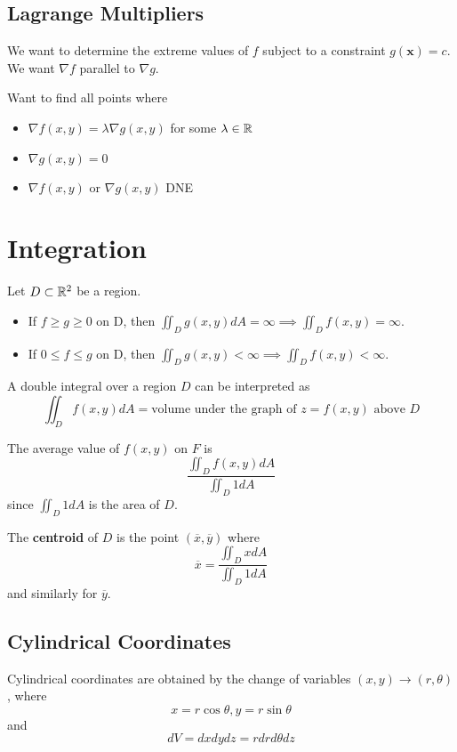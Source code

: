 \documentclass{article}
\begin{document}
\subsection{Lagrange Multipliers}
\begin{remark}
  We want to determine the extreme values of $f$ subject to a constraint $g(\textbf{x}) = c$. We want $\nabla f$ parallel to $\nabla g$.
\end{remark}
\begin{theorem}
  Want to find all points where
  \begin{itemize}
    \item $\nabla f(x, y) = \lambda \nabla g(x, y)$ for some $\lambda \in \mathbb{R}$
    \item $\nabla g(x, y) = 0$
    \item $\nabla f(x, y)$ or $\nabla g(x, y)$ DNE
  \end{itemize}
\end{theorem}
\section{Integration}
\begin{cthm}
  Let $D \subset \mathbb{R}^2$ be a region.
  \begin{itemize}
    \item If $f \geq g \geq 0$ on D, then $
      \iint_D g(x, y) dA = \infty \implies \iint_D f(x, y) = \infty$.
    \item If $0 \leq f \leq g$ on D, then $
      \iint_D g(x, y) < \infty \implies \iint_D f(x, y) < \infty$.
  \end{itemize}
\end{cthm}
\begin{proposition}
  A double integral over a region $D$ can be interpreted as \[
    \iint_D f(x, y) dA = \text{volume under the graph of } z = f(x, y) \text{ above }D
  \]
\end{proposition}
\begin{theorem}
  The average value of $f(x, y)$ on $F$ is \[
    \frac{\iint_D f(x,y) dA}{\iint_D 1 dA}
  \] since $\iint_D 1 dA$ is the area of $D$.
\end{theorem}
\begin{definition}
  The \textbf{centroid} of $D$ is the point $(\overline{x}, \overline{y})$ where \[
    \overline{x} = \frac{\iint_D x dA}{\iint_D 1 dA}
  \] and similarly for $\overline{y}$.
\end{definition}
\subsection{Cylindrical Coordinates}
\begin{definition}
  Cylindrical coordinates are obtained by the change of variables $(x, y) \to (r, \theta)$, where \[
    x = r\cos\theta, y=r\sin\theta
  \] and \[
    dV = dxdydz = rdrd\theta dz
  \]
\end{definition}
\end{document}
